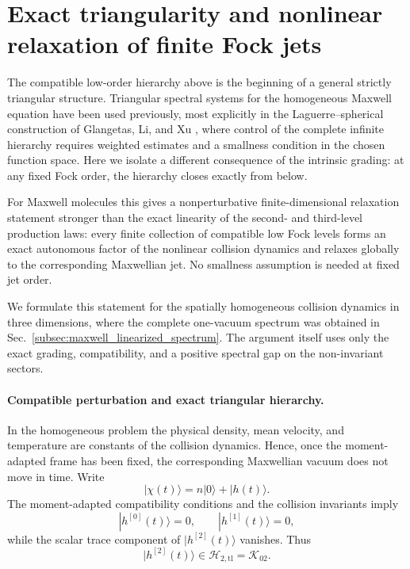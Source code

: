 \documentclass[11pt,oneside]{article}
\numberwithin{equation}{section}
\theoremstyle{definition}
\begin{document}
\section{Exact triangularity and nonlinear relaxation of finite Fock jets}
\label{subsec:maxwell_finite_jet_relaxation}

The compatible low-order hierarchy above is the beginning of a general
strictly triangular structure.  Triangular spectral systems for the
homogeneous Maxwell equation have been used previously, most explicitly in
the Laguerre--spherical construction of
Glangetas, Li, and Xu \cite{GlangetasLiXu2016Triangular}, where control of
the complete infinite hierarchy requires weighted estimates and a
smallness condition in the chosen function space.  Here we isolate a
different consequence of the intrinsic grading: at any fixed Fock order,
the hierarchy closes exactly from below.

For Maxwell molecules this gives a nonperturbative finite-dimensional
relaxation statement stronger than the exact linearity of the second- and
third-level production laws: every finite collection of compatible low
Fock levels forms an exact autonomous factor of the nonlinear collision
dynamics and relaxes globally to the corresponding Maxwellian jet.  No
smallness assumption is needed at fixed jet order.

We formulate this statement for the spatially homogeneous collision
dynamics in three dimensions, where the complete one-vacuum spectrum was
obtained in Sec.~\ref{subsec:maxwell_linearized_spectrum}.  The argument
itself uses only the exact grading, compatibility, and a positive spectral
gap on the non-invariant sectors.

\paragraph{Compatible perturbation and exact triangular hierarchy.}

In the homogeneous problem the physical density, mean velocity, and
temperature are constants of the collision dynamics.  Hence, once the
moment-adapted frame has been fixed, the corresponding Maxwellian vacuum
does not move in time.  Write
\begin{equation}
|\chi(t)\rangle
=
n|0\rangle+|h(t)\rangle .
\label{eq:maxwell_jet_perturbation}
\end{equation}
The moment-adapted compatibility conditions and the collision invariants
imply
\begin{equation}
|h^{[0]}(t)\rangle=0,
\qquad
|h^{[1]}(t)\rangle=0,
\label{eq:maxwell_jet_compatibility_01}
\end{equation}
while the scalar trace component of
$|h^{[2]}(t)\rangle$ vanishes.  Thus
\begin{equation}
|h^{[2]}(t)\rangle
\in
\mathscr H_{2,\mathrm{tl}}
=
\mathscr K_{02}.
\label{eq:maxwell_jet_compatibility_2}
\end{equation}
\end{document}
